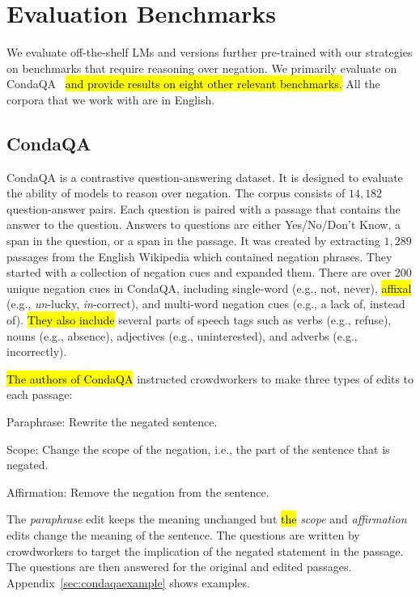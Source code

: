 \section{Evaluation Benchmarks}
\label{sec:evaluation}

We evaluate off-the-shelf LMs and versions further pre-trained with our strategies on benchmarks that require reasoning over negation.
We primarily evaluate on CondaQA~\cite{ravichander-etal-2022-condaqa} \hl{and provide results on eight other relevant benchmarks.}
All the corpora that we work with are in English.

\subsection{CondaQA}
\label{sec:condaqa}

CondaQA \cite{ravichander-etal-2022-condaqa} is a contrastive question-answering dataset.
It is designed to evaluate the ability of models to reason over negation.
The corpus consists of $14,182$ question-answer pairs. 
Each question is paired with a passage that contains the answer to the question.
Answers to questions are either Yes/No/Don't Know, a span in the question, or a span in the passage.
It was created by extracting $1,289$ passages from the English Wikipedia 
which contained negation phrases.
They started with a collection of negation cues 
\cite{Morante2011NegationCues, van-son-etal-2016-building} 
and expanded them. 
There are over 200 unique negation cues in CondaQA,
including 
single-word (e.g., not, never), 
\hl{affixal} (e.g., \emph{un}-lucky, \emph{in}-correct),
and multi-word negation cues (e.g., a lack of, instead of).
\hl{They also include} several parts of speech tags such as
verbs (e.g., refuse), 
nouns (e.g., absence), 
adjectives (e.g., uninterested), 
and adverbs (e.g., incorrectly).


\hl{The authors of CondaQA} instructed crowdworkers to make three types of edits to each passage:
\begin{compactitem}
    \item {Paraphrase}: Rewrite the negated sentence.
    \item {Scope}: Change the scope of the negation, i.e., the part of the sentence that is negated.
    \item {Affirmation}: Remove the negation from the sentence.
\end{compactitem}

The \emph{paraphrase} edit keeps the meaning unchanged but \hl{the} \emph{scope} and \emph{affirmation} edits change the meaning of the sentence.
The questions are written by crowdworkers to target the implication of the negated statement in the passage.
The questions are then answered for the original and edited passages. 
Appendix~\ref{sec:condaqaexample} shows examples.

